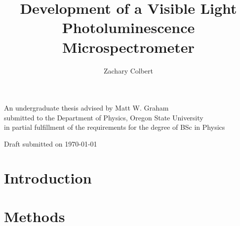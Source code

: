 \documentclass[12pt]{article}
\title{Development of a Visible Light Photoluminescence Microspectrometer }
\author{Zachary Colbert}
\renewenvironment{abstract}
 {%
  \global\setbox\abstractbox=\vtop\bgroup
  \begin{center}\bfseries\abstractname\end{center}%
 }
 {\par\egroup}
\begin{document}

  \begin{titlepage}
    \begin{center}
        \vspace*{1cm}
  
        \textbf{\thetitle}
  
        \vspace{3cm}
  
        \textbf{\theauthor}
  
        \vspace{10cm}
  
        An undergraduate thesis advised by Matt W. Graham \\
        submitted to the Department of Physics, Oregon State University \\
        in partial fulfillment of the requirements for the degree of BSc in Physics
  
        \vfill
  
        Draft submitted on \today
  
    \end{center}
  \end{titlepage}

  

  \tableofcontents
  \listoffigures


  \section{Introduction}\label{chap:intro}
  

  

  \section{Methods}\label{chap:methods}
  
\end{document}
